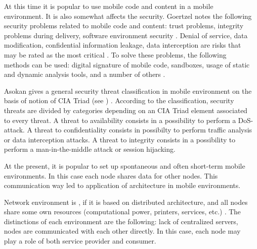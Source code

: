 %
At this time it is popular to use mobile code and content in a mobile environment. 
%
It is also somewhat affects the security. 
%
Goertzel notes the following security problems related to mobile code and content: trust problems, integrity problems during delivery, software environment security . 
%
Denial of service, data modification, confidential information leakage, data interception are risks that may be rated as the most critical . 
%
To solve these problems, the following methods can be used: digital signature of mobile code, sandboxes, usage of static and dynamic analysis tools, and a number of others    . 

%
Asokan gives a general security threat classification in mobile environment on the basis of notion of CIA Triad (see ) . 
%
According to the classification, security threats are divided by categories depending on an CIA Triad element associated to every threat. 
%
A threat to availability consists in a possibility to perform a DoS-attack. 
%
A threat to confidentiality consists in possibilty to perform traffic analysis or data interception attacks. 
%
A threat to integrity consists in a possibility to perform a man-in-the-middle attack or session hijacking. 

%
At the present, it is popular to set up spontaneous and often short-term mobile environments. 
%
In this case each node shares data for other nodes. 
%
This communication way led to application of  architecture in mobile environments. 



%
Network environment is , if it is based on distributed architecture, and all nodes share some own resources (computational power, printers, services, etc.) . 
%
The distinctions of each  environment are the following: lack of centralized servers, nodes are communicated with each other directly. 
%
In this case, each node may play a role of both service provider and consumer. 


